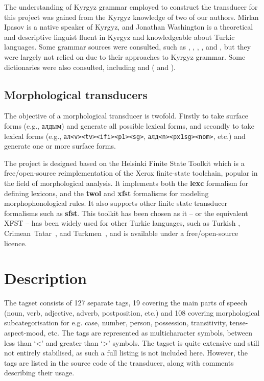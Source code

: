 \documentclass[10pt,a4paper,twocolumn]{article}
\newcommand{\citetwoyears}[2]{\citeauthor{#1} (\citeyear{#1} and \citeyear{#2})}
\begin{document}
The understanding of Kyrgyz grammar employed to construct the transducer for this project was gained from the Kyrgyz knowledge of two of our authors.  Mirlan Ipasov is a native speaker of Kyrgyz, and Jonathan Washington is a theoretical and descriptive linguist fluent in Kyrgyz and knowledgeable about Turkic languages.  Some grammar sources were consulted, such as \cite{hebertpoppe1963}, \cite{usonalievomuraliev2003}, \cite{qudaybergenov1980}, \cite{somfaikara2003}, and \cite{imart1981}, but they were largely not relied on due to their approaches to Kyrgyz grammar.  Some dictionaries were also consulted, including \cite{jumakunova2005} and \citetwoyears{yudakhin1957}{yudakhin1965}.

\subsection{Morphological transducers}
The objective of a morphological transducer is twofold. Firstly to take surface forms (e.g., алдым) and generate all possible lexical forms, and secondly to take lexical forms (e.g.,  ал{\tt {\small <v><tv><ifi><p1><sg>}}, алд{\tt {\small <n><px1sg><nom>}}, etc.) and generate one or more surface forms. 

The project is designed based on the Helsinki Finite State Toolkit \citep{linden2011} which is a free/open-source reimplementation of the Xerox finite-state toolchain, popular in the field of morphological analysis. It implements both the \textbf{lexc} formalism for defining lexicons, and the \textbf{twol} and \textbf{xfst} formalisms for modeling morphophonological rules. It also supports other finite state transducer formalisms such as \textbf{sfst}. This toolkit has been chosen as it -- or the equivalent XFST -- has been widely used for other Turkic languages, such as Turkish \citep{coltekin2010}, Crimean~Tatar~\citep{altintas2001}, and Turkmen~\citep{tantug2006}, and is available under a free/open-source licence.

\section{Description}
The tagset consists of 127 separate tags, 19 covering the main parts of speech (noun, verb, adjective, adverb, postposition, etc.) and 108 covering morphological subcategorisation for e.g. case, number, person, possession, transitivity, tense-aspect-mood, etc. The tags are represented as multicharacter symbols, between less than `<' and greater than `>' symbols. The tagset is quite extensive and still not entirely stabilised, as such a full listing is not included here. However, the tags are listed in the source code of the transducer, along with comments describing their usage.
\end{document}
